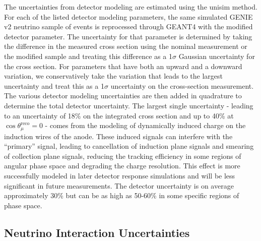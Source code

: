 The uncertainties from detector modeling are estimated using the unisim method.  For each of the listed detector modeling parameters, the same simulated GENIE v2 neutrino sample of events is reprocessed through GEANT4 with the modified detector parameter. The uncertainty for that parameter is determined by taking the difference in the measured cross section using the nominal measurement or the modified sample and treating this difference as a 1$\sigma$ Gaussian uncertainty for the cross section. For parameters that have both an upward and a downward variation,
we conservatively take the variation that leads to the largest uncertainty and treat this as a 1$\sigma$ uncertainty on the cross-section measurement. The various detector modeling uncertainties are then added in quadrature to determine the total detector uncertainty. 
The largest single uncertainty - leading to an uncertainty of 18\% on the integrated cross section and up to 40\% at $\cos \theta_{\mu}^{\text{reco}} = 0$ - comes from the modeling of dynamically induced charge on the induction wires of the anode. 
These induced signals can interfere with the ``primary'' signal, leading to cancellation of induction plane signals and smearing of collection plane signals, reducing the tracking efficiency in some regions of angular phase space and degrading the charge resolution.
This effect is more successfully modeled in later detector response simulations and will be less significant in future measurements. The detector uncertainty is on average approximately 30\% but can be as high as 50-60\% in some specific regions of phase space.

\subsection{Neutrino Interaction Uncertainties}
\label{sect:syst_genie}

